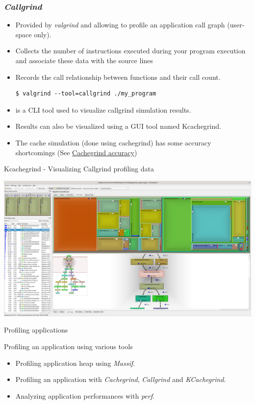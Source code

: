 \begin{frame}[fragile]
  \frametitle{{\em Callgrind}}
  \begin{itemize}
    \item Provided by {\em valgrind} and allowing to profile an application call graph
          (user-space only).
    \item Collects the number of instructions executed during your program
          execution and associate these data with the source lines
    \item Records the call relationship between functions and their call
          count.
  \begin{block}{}
    \begin{verbatim}
$ valgrind --tool=callgrind ./my_program
    \end{verbatim}
  \end{block}

  \item {} is a CLI tool used to visualize callgrind
        simulation results.
  \item Results can also be visualized using a GUI tool named Kcachegrind.
  \item The cache simulation (done using cachegrind) has some accuracy
        shortcomings (See \href{https://valgrind.org/docs/manual/cg-manual.html#cg-manual.annopts.accuracy}{Cachegrind accuracy})
  \end{itemize}
\end{frame}

\begin{frame}{Kcachegrind - Visualizing Callgrind profiling data}
  \begin{center}
    \includegraphics[height=0.8\textheight]{slides/debugging-application-profiling/kcachegrind_callgrind.png}
  \end{center}
\end{frame}

\setuplabframe
{Profiling applications}
{
  Profiling an application using various tools
  \begin{itemize}
    \item Profiling application heap using {\em Massif}.
    \item Profiling an application with {\em Cachegrind}, {\em Callgrind} and
          {\em KCachegrind}.
    \item Analyzing application performances with {\em perf}.
  \end{itemize}
}